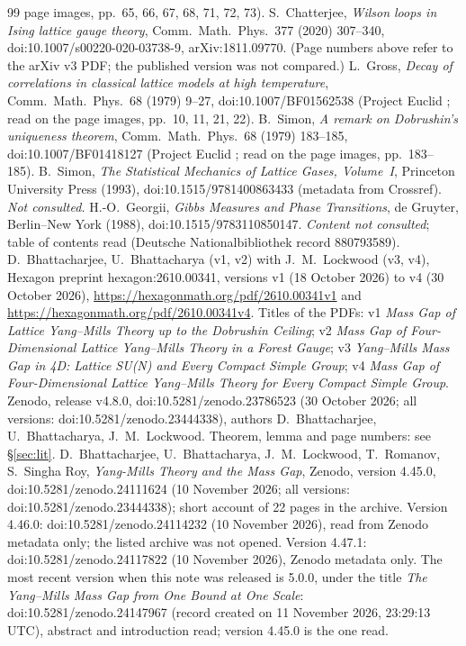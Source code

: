 \documentclass[11pt,a4paper]{article}
\theoremstyle{remark}
\theoremstyle{definition}
\theoremstyle{plain}
\theoremstyle{remark}
\begin{document}
\begin{thebibliography}{99}
page images, pp.~65, 66, 67, 68, 71, 72, 73).
 S.~Chatterjee, \emph{Wilson loops in Ising lattice gauge theory}, Comm.\ Math.\ Phys.\ 377
(2020) 307--340, doi:10.1007/s00220-020-03738-9, arXiv:1811.09770. (Page numbers above refer to the arXiv v3
PDF; the published version was not compared.)
 L.~Gross, \emph{Decay of correlations in classical lattice models at high temperature},
Comm.\ Math.\ Phys.\ 68 (1979) 9--27, doi:10.1007/BF01562538 (Project Euclid ; read on the
page images, pp.~10, 11, 21, 22).
 B.~Simon, \emph{A remark on Dobrushin's uniqueness theorem}, Comm.\ Math.\ Phys.\ 68 (1979)
183--185, doi:10.1007/BF01418127 (Project Euclid ; read on the page images, pp.~183--185).
 B.~Simon, \emph{The Statistical Mechanics of Lattice Gases, Volume~I}, Princeton University
Press (1993), doi:10.1515/9781400863433 (metadata from Crossref). \emph{Not consulted.}
 H.-O.~Georgii, \emph{Gibbs Measures and Phase Transitions}, de Gruyter, Berlin--New York (1988),
doi:10.1515/9783110850147. \emph{Content not consulted}; table of contents read (Deutsche Nationalbibliothek
record 880793589).
 D.~Bhattacharjee, U.~Bhattacharya (v1, v2) with J.~M.~Lockwood (v3, v4), Hexagon preprint hexagon:2610.00341, versions v1 (18 October 2026) to v4 (30 October 2026),
\url{https://hexagonmath.org/pdf/2610.00341v1} and \url{https://hexagonmath.org/pdf/2610.00341v4}. Titles of the PDFs: v1 \emph{Mass Gap of Lattice Yang--Mills Theory up to the Dobrushin Ceiling};
v2 \emph{Mass Gap of Four-Dimensional Lattice Yang--Mills Theory in a Forest Gauge}; v3 \emph{Yang--Mills Mass Gap in 4D: Lattice SU(N) and Every Compact Simple Group};
v4 \emph{Mass Gap of Four-Dimensional Lattice Yang--Mills Theory for Every Compact Simple Group}. Zenodo, release v4.8.0, doi:10.5281/zenodo.23786523 (30 October 2026; all versions: doi:10.5281/zenodo.23444338),
authors D.~Bhattacharjee, U.~Bhattacharya, J.~M.~Lockwood. Theorem, lemma and page numbers: see \S\ref{sec:lit}.
 D.~Bhattacharjee, U.~Bhattacharya, J.~M.~Lockwood, T.~Romanov, S.~Singha Roy, \emph{Yang-Mills Theory and the Mass Gap}, Zenodo, version 4.45.0, doi:10.5281/zenodo.24111624 (10 November 2026; all versions: doi:10.5281/zenodo.23444338); short account of 22 pages in the archive. Version 4.46.0: doi:10.5281/zenodo.24114232 (10 November 2026), read from Zenodo metadata only; the listed archive  was not opened. Version 4.47.1: doi:10.5281/zenodo.24117822 (10 November 2026), Zenodo metadata only. The most recent version when this note was released is 5.0.0, under the title \emph{The Yang--Mills Mass Gap from One Bound at One Scale}: doi:10.5281/zenodo.24147967 (record created on 11 November 2026, 23:29:13 UTC), abstract and introduction read; version 4.45.0 is the one read.

\end{thebibliography}
\end{document}

